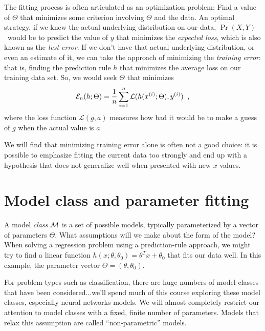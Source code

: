 The fitting process is often articulated as an optimization problem:
Find a value of $\Theta$ that minimizes some criterion involving
$\Theta$ and the data. An optimal strategy, if we knew the actual underlying distribution on
our data, $\Pr(X,Y)$\  would be to predict the value of $y$ that	%
minimizes the {\em expected loss}, which is also known as the {\em
    test error}.  If we don't have that actual underlying distribution, or
even an estimate of it, we can take the approach of minimizing the
  {\em training error}: that is, finding the prediction rule $h$ that
minimizes the average loss on our training data set.  So, we would
seek $\Theta$ that minimizes
\begin{eqnarray*}
  \mathcal{E}_n(h; \Theta) =  \frac{1}{n}\sum_{i = 1}^n
  \mathcal{L}(h(x^{(i)};\Theta), y^{(i)})\;\;,
\end{eqnarray*}
where the loss function $\mathcal{L}(g, a)$ measures how bad it would be to make a guess of $g$ when the actual value is $a$.

We will find that minimizing training error alone is often not a good
choice: it is possible to emphasize fitting the current data too
strongly and end up with a hypothesis that does not generalize well
when presented with new $x$ values.


\section{Model class and parameter fitting}\label{modelClass}

A model {\em class} ${\cal M}$ is a set of possible models, typically  parameterized by a vector of parameters $\Theta$.
What assumptions will we make about the form of the model?  When
solving a regression problem using a prediction-rule approach, we
might try to find a linear function $h(x ; \theta, \theta_0) = \theta^T x + \theta_0$
that fits our data well.  In this example, the parameter vector
$\Theta = (\theta, \theta_0)$.

For problem types such as classification, there
are huge numbers of model classes that have been considered...we'll
spend much of this course exploring these model classes, especially
neural networks models.
We will almost completely restrict our attention to model classes with
a fixed, finite number of parameters.  Models that
relax this assumption are called ``non-parametric'' models.

